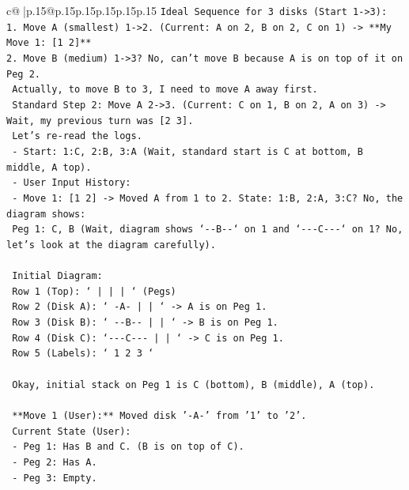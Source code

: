 \documentclass{article}
\begin{document}
{\begin{supertabular}{c@{$\;$}|p{.15\linewidth}@{}p{.15\linewidth}p{.15\linewidth}p{.15\linewidth}p{.15\linewidth}p{.15\linewidth}}
{{{\texttt{Ideal Sequence for 3 disks (Start 1{-}>3):} \\
\texttt{1. Move A (smallest) 1{-}>2. (Current: A on 2, B on 2, C on 1) {-}> **My Move 1: {[}1 2{]}**} \\
\texttt{2. Move B (medium) 1{-}>3? No, can't move B because A is on top of it on Peg 2.} \\
\texttt{   Actually, to move B to 3, I need to move A away first.} \\
\texttt{   Standard Step 2: Move A 2{-}>3. (Current: C on 1, B on 2, A on 3) {-}> Wait, my previous turn was {[}2 3{]}.} \\
\texttt{   Let's re{-}read the logs.} \\
\texttt{   {-} Start: 1:C, 2:B, 3:A (Wait, standard start is C at bottom, B middle, A top).} \\
\texttt{   {-} User Input History:} \\
\texttt{     {-} Move 1: {[}1 2{]} {-}> Moved A from 1 to 2. State: 1:B, 2:A, 3:C? No, the diagram shows:} \\
\texttt{       Peg 1: C, B (Wait, diagram shows `{-}{-}B{-}{-}` on 1 and `{-}{-}{-}C{-}{-}{-}` on 1? No, let's look at the diagram carefully).} \\
\\ 
\texttt{       Initial Diagram:} \\
\texttt{       Row 1 (Top): `   |       |       |   ` (Pegs)} \\
\texttt{       Row 2 (Disk A): ` {-}A{-}      |       |   ` {-}> A is on Peg 1.} \\
\texttt{       Row 3 (Disk B): ` {-}{-}B{-}{-}     |       |   ` {-}> B is on Peg 1.} \\
\texttt{       Row 4 (Disk C): `{-}{-}{-}C{-}{-}{-}    |       |   ` {-}> C is on Peg 1.} \\
\texttt{       Row 5 (Labels): `   1       2       3   `} \\
\\ 
\texttt{       Okay, initial stack on Peg 1 is C (bottom), B (middle), A (top).} \\
\\ 
\texttt{       **Move 1 (User):** Moved disk '{-}A{-}' from '1' to '2'.} \\
\texttt{       Current State (User):} \\
\texttt{       {-} Peg 1: Has B and C. (B is on top of C).} \\
\texttt{       {-} Peg 2: Has A.} \\
\texttt{       {-} Peg 3: Empty.} \\
}}}
\end{supertabular}}
\end{document}
